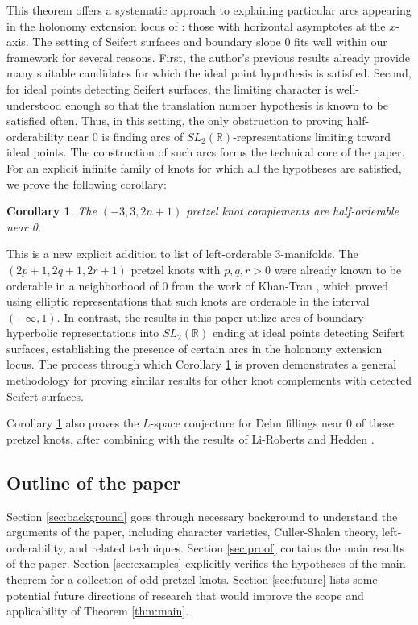 \documentclass{article}
\theoremstyle{plain}
\theoremstyle{definition}
\theoremstyle{plain}
\theoremstyle{plain}
\newtheorem{corollary}[theorem]{Corollary}
\theoremstyle{plain}
\theoremstyle{remark}
\theoremstyle{remark}
\theoremstyle{plain}
\theoremstyle{plain}
\begin{document}
This theorem offers a systematic approach to explaining particular arcs appearing in the holonomy extension locus of \cite{gao}: those with horizontal asymptotes at the $x$-axis. The setting of Seifert surfaces and boundary slope 0 fits well within our framework for several reasons. First, the author's previous results \cite{wang} already provide many suitable candidates for which the ideal point hypothesis is satisfied. Second, for ideal points detecting Seifert surfaces, the limiting character is well-understood enough so that the translation number hypothesis is known to be satisfied often. Thus, in this setting, the only obstruction to proving half-orderability near 0 is finding arcs of $SL_2(\mathbb{R})$-representations limiting toward ideal points. The construction of such arcs forms the technical core of the paper. For an explicit infinite family of knots for which all the hypotheses are satisfied, we prove the following corollary:

\begin{corollary}\label{thm:pretzel}
The $(-3, 3, 2n+1)$ pretzel knot complements are half-orderable near 0.
\end{corollary}

This is a new explicit addition to list of left-orderable 3-manifolds. The $(2p+1, 2q+1, 2r+1)$ pretzel knots with $p, q, r > 0$ were already known to be orderable in a neighborhood of 0 from the work of Khan-Tran \cite{khantran}, which proved using elliptic representations that such knots are orderable in the interval $(-\infty, 1)$. In contrast, the results in this paper utilize arcs of boundary-hyperbolic representations into $SL_2(\mathbb{R})$ ending at ideal points detecting Seifert surfaces, establishing the presence of certain arcs in the holonomy extension locus. The process through which Corollary \ref{thm:pretzel} is proven demonstrates a general methodology for proving similar results for other knot complements with detected Seifert surfaces. 

\medskip

Corollary \ref{thm:pretzel} also proves the $L$-space conjecture for Dehn fillings near 0 of these pretzel knots, after combining with the results of Li-Roberts \cite{liroberts} and Hedden \cite{hedden}. 

\subsection{Outline of the paper}

Section \ref{sec:background} goes through necessary background to understand the arguments of the paper, including character varieties, Culler-Shalen theory, left-orderability, and related techniques. Section \ref{sec:proof} contains the main results of the paper. Section \ref{sec:examples} explicitly verifies the hypotheses of the main theorem for a collection of odd pretzel knots. Section \ref{sec:future} lists some potential future directions of research that would improve the scope and applicability of Theorem \ref{thm:main}. 
\end{document}

